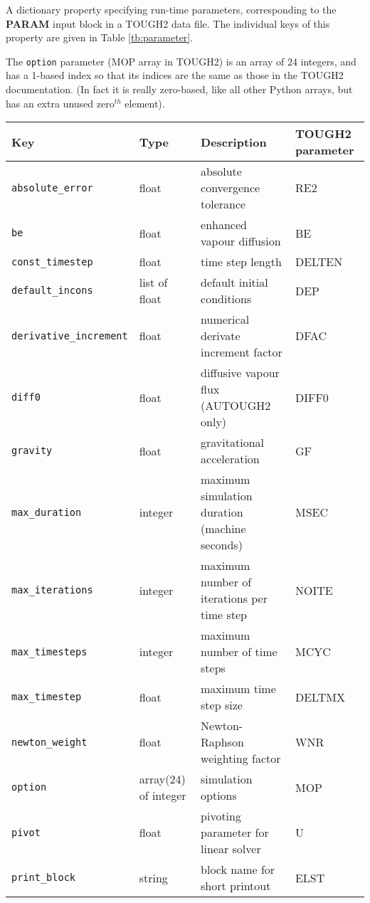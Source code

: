 A dictionary property specifying run-time parameters, corresponding to the \textbf{PARAM} input block in a TOUGH2 data file.  The individual keys of this property are given in Table \ref{tb:parameter}.

The \texttt{option} parameter (MOP array in TOUGH2) is an array of 24 integers, and has a 1-based index so that its indices are the same as those in the TOUGH2 documentation.  (In fact it is really zero-based, like all other Python arrays, but has an extra unused zero$^{th}$ element).

\begin{sidewaystable}
  \begin{center}
    \begin{tabular}{|l|l|l|l|}
      \hline
      \textbf{Key} & \textbf{Type} & \textbf{Description} & \textbf{TOUGH2 parameter}\\
      \hline
      \texttt{absolute\_error} & float & absolute convergence tolerance & RE2\\
      \texttt{be} & float & enhanced vapour diffusion & BE\\
      \texttt{const\_timestep} & float & time step length & DELTEN\\
      \texttt{default\_incons} & list of float & default initial conditions & DEP\\
      \texttt{derivative\_increment} & float & numerical derivate increment factor & DFAC\\
      \texttt{diff0} & float & diffusive vapour flux (AUTOUGH2 only) & DIFF0\\
      \texttt{gravity} & float & gravitational acceleration & GF\\
      \texttt{max\_duration} & integer & maximum simulation duration (machine seconds) & MSEC\\
      \texttt{max\_iterations} & integer & maximum number of iterations per time step & NOITE\\
      \texttt{max\_timesteps} & integer & maximum number of time steps & MCYC\\
      \texttt{max\_timestep} & float & maximum time step size & DELTMX\\
      \texttt{newton\_weight} & float & Newton-Raphson weighting factor & WNR\\
      \texttt{option} & array(24) of integer & simulation options & MOP\\
      \texttt{pivot} & float & pivoting parameter for linear solver & U\\
      \texttt{print\_block} & string & block name for short printout & ELST\\

\end{tabular}
\end{center}
\end{sidewaystable}
